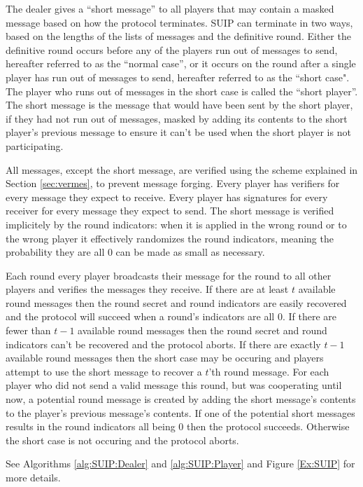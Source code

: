 \documentclass{dalcsthesis}
\begin{document}
The dealer gives a ``short message'' to all players that may contain a masked message based on how the protocol terminates. SUIP can terminate in two ways, based on the lengths of the lists of messages and the definitive round. Either the definitive round occurs before any of the players run out of messages to send, hereafter referred to as the ``normal case'', or it occurs on the round after a single player has run out of messages to send, hereafter referred to as the ``short case". The player who runs out of messages in the short case is called the ``short player''. The short message is the message that would have been sent by the short player, if they had not run out of messages, masked by adding its contents to the short player's previous message to ensure it can't be used when the short player is not participating.

All messages, except the short message, are verified using the scheme explained in Section \ref{sec:vermes}, to prevent message forging. Every player has verifiers for every message they expect to receive. Every player has signatures for every receiver for every message they expect to send. The short message is verified implicitely by the round indicators: when it is applied in the wrong round or to the wrong player it effectively randomizes the round indicators, meaning the probability they are all 0 can be made as small as necessary.

Each round every player broadcasts their message for the round to all other players and verifies the messages they receive. If there are at least $t$ available round messages then the round secret and round indicators are easily recovered and the protocol will succeed when a round's indicators are all 0. If there are fewer than $t-1$ available round messages then the round secret and round indicators can't be recovered and the protocol aborts. If there are exactly $t-1$ available round messages then the short case may be occuring and players attempt to use the short message to recover a $t$'th round message. For each player who did not send a valid message this round, but was cooperating until now, a potential round message is created by adding the short message's contents to the player's previous message's contents. If one of the potential short messages results in the round indicators all being 0 then the protocol succeeds. Otherwise the short case is not occuring and the protocol aborts.

See Algorithms \ref{alg:SUIP:Dealer} and \ref{alg:SUIP:Player} and Figure \ref{Ex:SUIP} for more details.
\end{document}
